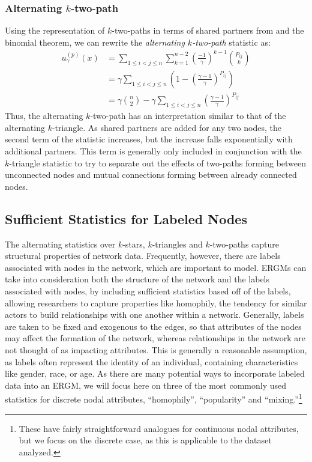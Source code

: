 \subsubsection{Alternating $k$-two-path}

Using the representation of $k$-two-paths in terms of shared partners from  and the binomial theorem, we can rewrite the \emph{alternating $k$-two-path} statistic as: 
\begin{align}
\label{eq:alternative-k-two-path}
u_\gamma^{(p)}(x) & = \sum_{1 \leq i < j \leq n} \sum_{k = 1}^{n-2} \left(\frac{-1}{\gamma}\right)^{k-1}  \binom{P_{ij}}{k} \nonumber\\
& = \gamma \sum_{1 \leq i < j \leq n}\left(1 - \left(\frac{\gamma-1}{\gamma} \right)^{P_{ij}} \right) \nonumber\\
& = \gamma \binom{n}{2} - \gamma \sum_{1 \leq i < j \leq n} \left(\frac{\gamma-1}{\gamma} \right)^{P_{ij}}
\end{align}
Thus, the alternating $k$-two-path has an interpretation similar to that of the alternating $k$-triangle. As shared partners are added for any two nodes, the second term of the statistic increases, but the increase falls exponentially with additional partners. This term is generally only included in conjunction with the $k$-triangle statistic to try to separate out the effects of two-paths forming between unconnected nodes and mutual connections forming between already connected nodes.

\subsection{Sufficient Statistics for Labeled Nodes}

The alternating statistics over $k$-stars, $k$-triangles and $k$-two-paths capture structural properties of network data. Frequently, however, there are labels associated with nodes in the network, which are important to model. ERGMs can take into consideration both the structure of the network and the labels associated with nodes, by including sufficient statistics based off of the labels, allowing researchers to capture properties like homophily, the tendency for similar actors to build relationships with one another within a network. Generally, labels are taken to be fixed and exogenous to the edges, so that attributes of the nodes may affect the formation of the network, whereas relationships in the network are not thought of as impacting attributes. This is generally a reasonable assumption, as labels often represent the identity of an individual, containing characteristics like gender, race, or age. As there are many potential ways to incorporate labeled data into an ERGM, we will focus here on three of the most commonly used statistics for discrete nodal attributes, ``homophily'', ``popularity'' and ``mixing.''\footnote{These have fairly straightforward analogues for continuous nodal attributes, but we focus on the discrete case, as this is applicable to the dataset analyzed.} 

